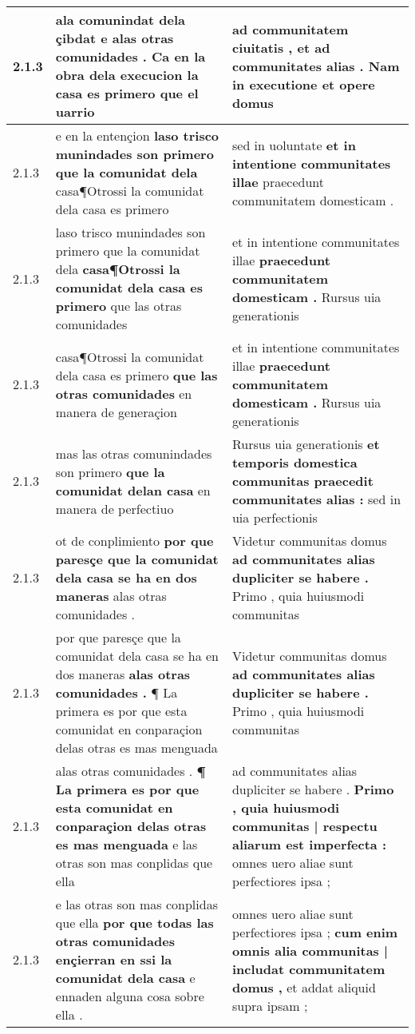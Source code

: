 \begin{tabular}{|p{1cm}|p{6.5cm}|p{6.5cm}|}
2.1.3 & ala comunindat dela çibdat \textbf{ e alas otras comunidades . } Ca en la obra dela execucion la casa es primero que el uarrio & ad communitatem ciuitatis , \textbf{ et ad communitates alias . } Nam in executione et opere domus \\\hline
2.1.3 & e en la entençion \textbf{ laso trisco munindades son primero que la comunidat dela } casa¶Otrossi la comunidat dela casa es primero & sed in uoluntate \textbf{ et in intentione communitates illae } praecedunt communitatem domesticam . \\\hline
2.1.3 & laso trisco munindades son primero que la comunidat dela \textbf{ casa¶Otrossi la comunidat dela casa es primero } que las otras comunidades & et in intentione communitates illae \textbf{ praecedunt communitatem domesticam . } Rursus uia generationis \\\hline
2.1.3 & casa¶Otrossi la comunidat dela casa es primero \textbf{ que las otras comunidades } en manera de generaçion & et in intentione communitates illae \textbf{ praecedunt communitatem domesticam . } Rursus uia generationis \\\hline
2.1.3 & mas las otras comunindades son primero \textbf{ que la comunidat delan casa } en manera de perfectiuo & Rursus uia generationis \textbf{ et temporis domestica communitas praecedit communitates alias : } sed in uia perfectionis \\\hline
2.1.3 & ot de conplimiento \textbf{ por que paresçe que la comunidat dela casa se ha en dos maneras } alas otras comunidades . & Videtur communitas domus \textbf{ ad communitates alias dupliciter se habere . } Primo , quia huiusmodi communitas \\\hline
2.1.3 & por que paresçe que la comunidat dela casa se ha en dos maneras \textbf{ alas otras comunidades . } ¶ La primera es por que esta comunidat en conparaçion delas otras es mas menguada & Videtur communitas domus \textbf{ ad communitates alias dupliciter se habere . } Primo , quia huiusmodi communitas \\\hline
2.1.3 & alas otras comunidades . \textbf{ ¶ La primera es por que esta comunidat en conparaçion delas otras es mas menguada } e las otras son mas conplidas que ella & ad communitates alias dupliciter se habere . \textbf{ Primo , quia huiusmodi communitas | respectu aliarum est imperfecta : } omnes uero aliae sunt perfectiores ipsa ; \\\hline
2.1.3 & e las otras son mas conplidas que ella \textbf{ por que todas las otras comunidades ençierran en ssi la comunidat dela casa } e ennaden alguna cosa sobre ella . & omnes uero aliae sunt perfectiores ipsa ; \textbf{ cum enim omnis alia communitas | includat communitatem domus , } et addat aliquid supra ipsam ; \\\hline

\end{tabular}
